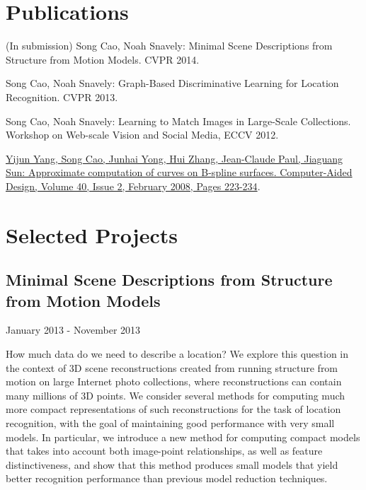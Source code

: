 \documentclass[10pt,letterpaper]{article}
\renewenvironment{itemize}{
  \begin{list}{}{
    \setlength{\leftmargin}{1.5em}
    \setlength{\itemsep}{0.25em}
    \setlength{\parskip}{0pt}
    \setlength{\parsep}{0.25em}
  }
}{
  \end{list}
}
\begin{document}
\section*{Publications}
\begin{itemize}
\item (In submission) Song Cao, Noah Snavely: Minimal Scene Descriptions from Structure from Motion Models. CVPR 2014.
\item Song Cao, Noah Snavely: Graph-Based Discriminative Learning for Location Recognition. CVPR 2013.
\item Song Cao, Noah Snavely: Learning to Match Images in Large-Scale Collections. Workshop on Web-scale Vision and Social Media, ECCV 2012.
\item \href{http://dx.doi.org/10.1016/j.cad.2007.10.011}{Yijun Yang, Song Cao, Junhai Yong, Hui Zhang, Jean-Claude Paul, Jiaguang Sun: Approximate computation of curves on B-spline surfaces. Computer-Aided Design, Volume 40, Issue 2, February 2008, Pages 223-234}.
\end{itemize}

\section*{Selected Projects}
\subsection*{Minimal Scene Descriptions from Structure from Motion Models}
\begin{itemize}
\item January 2013 - November 2013
\item How much data do we need to describe a location? We explore this question in the context of 3D scene reconstructions created from running structure from motion on large Internet photo collections, where reconstructions can contain many millions of 3D points. We consider several methods for computing much more compact representations of such reconstructions for the task of location recognition, with the goal of maintaining good performance with very small models. In particular, we introduce a new method for computing compact models that takes into account both image-point relationships, as well as feature distinctiveness, and show that this method produces small models that yield better recognition performance than previous model reduction techniques.
\end{itemize}
\end{document}
